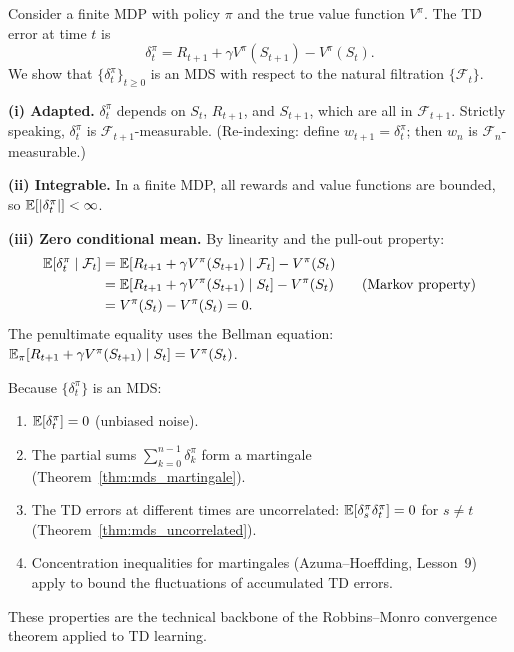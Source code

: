 \documentclass[11pt,a4paper]{article}
\begin{document}
\begin{rlconnection}[title={TD Error as MDS}]
Consider a finite MDP with policy $\pi$ and the true value
function $V^\pi$.  The TD error at time $t$ is
\begin{equation}
  \delta_t^\pi = R_{t+1} + \gamma V^\pi(S_{t+1})
  - V^\pi(S_t).
  \label{eq:td_error}
\end{equation}
We show that $\{\delta_t^\pi\}_{t \geq 0}$ is an MDS with
respect to the natural filtration $\{\mathcal{F}_t\}$.

\textbf{(i) Adapted.}
$\delta_t^\pi$ depends on $S_t$, $R_{t+1}$, and $S_{t+1}$,
which are all in $\mathcal{F}_{t+1}$.  Strictly speaking,
$\delta_t^\pi$ is $\mathcal{F}_{t+1}$-measurable.
(Re-indexing: define $w_{t+1} = \delta_t^\pi$; then $w_n$ is
$\mathcal{F}_n$-measurable.)

\textbf{(ii) Integrable.}
In a finite MDP, all rewards and value functions are bounded, so
$\mathbb{E}[|\delta_t^\pi|] < \infty$.

\textbf{(iii) Zero conditional mean.}
By linearity and the pull-out property:
\begin{align}
  \mathbb{E}[\delta_t^\pi \mid \mathcal{F}_t]
  &= \mathbb{E}[R_{t+1} + \gamma V^\pi(S_{t+1}) \mid \mathcal{F}_t]
    - V^\pi(S_t)
  \nonumber\\
  &= \mathbb{E}[R_{t+1} + \gamma V^\pi(S_{t+1}) \mid S_t]
    - V^\pi(S_t)
  \tag{Markov property}\\
  &= V^\pi(S_t) - V^\pi(S_t)
  = 0.
  \label{eq:td_mds_proof}
\end{align}
The penultimate equality uses the Bellman equation:
$\mathbb{E}_\pi[R_{t+1} + \gamma V^\pi(S_{t+1}) \mid S_t]
= V^\pi(S_t)$.
\end{rlconnection}

\begin{remark}
Because $\{\delta_t^\pi\}$ is an MDS:
\begin{enumerate}[nosep]
  \item $\mathbb{E}[\delta_t^\pi] = 0$ (unbiased noise).
  \item The partial sums $\sum_{k=0}^{n-1} \delta_k^\pi$ form a
    martingale (Theorem~\ref{thm:mds_martingale}).
  \item The TD errors at different times are uncorrelated:
    $\mathbb{E}[\delta_s^\pi \delta_t^\pi] = 0$ for $s \neq t$
    (Theorem~\ref{thm:mds_uncorrelated}).
  \item Concentration inequalities for martingales
    (Azuma--Hoeffding, Lesson~9) apply to bound the fluctuations
    of accumulated TD errors.
\end{enumerate}
These properties are the technical backbone of the Robbins--Monro
convergence theorem applied to TD learning.
\end{remark}
\end{document}
